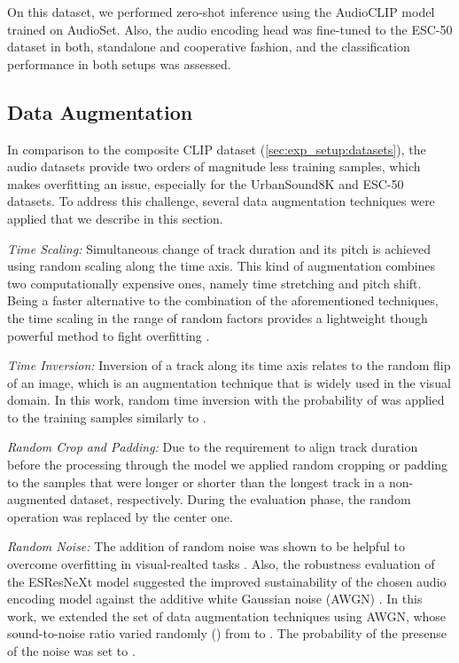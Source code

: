 \documentclass[runningheads]{llncs}
\begin{document}
On this dataset, we performed zero-shot inference using the \mbox{AudioCLIP} model trained on \mbox{AudioSet}.
Also, the audio encoding head was fine-tuned to the \mbox{ESC-50} dataset in both, standalone and cooperative fashion, and the classification performance in both setups was assessed.

\subsection{Data Augmentation} \label{sec:exp_setup:data_aug}
In comparison to the composite CLIP dataset (\autoref{sec:exp_setup:datasets}), the audio datasets provide two orders of magnitude less training samples, which makes overfitting an issue, especially for the \mbox{UrbanSound8K} and \mbox{ESC-50} datasets.
To address this challenge, several data augmentation techniques were applied that we describe in this section.

\emph{Time Scaling:} Simultaneous change of track duration and its pitch is achieved using random scaling along the time axis.
This kind of augmentation combines two computationally expensive ones, namely time stretching and pitch shift.
Being a faster alternative to the combination of the aforementioned techniques, the time scaling in the range of random factors  provides a lightweight though powerful method to fight overfitting \cite{guzhov2020esrn}.

\emph{Time Inversion:} Inversion of a track along its time axis relates to the random flip of an image, which is an augmentation technique that is widely used in the visual domain.
In this work, random time inversion with the probability of  was applied to the training samples similarly to \cite{guzhov2021esrnx}.

\emph{Random Crop and Padding:} Due to the requirement to align track duration before the processing through the model we applied random cropping or padding to the samples that were longer or shorter than the longest track in a non-augmented dataset, respectively.
During the evaluation phase, the random operation was replaced by the center one.

\emph{Random Noise:} The addition of random noise was shown to be helpful to overcome overfitting in visual-realted tasks \cite{hussain2017augment}.
Also, the robustness evaluation of the \mbox{ESResNeXt} model suggested the improved sustainability of the chosen audio encoding model against the additive white Gaussian noise (AWGN) \cite{guzhov2021esrnx}.
In this work, we extended the set of data augmentation techniques using AWGN, whose sound-to-noise ratio varied randomly () from  to .
The probability of the presense of the noise was set to .
\end{document}
